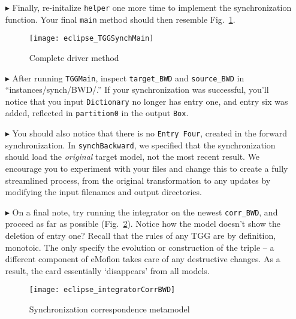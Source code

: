 \begin{itemize}
\item[$\blacktriangleright$] Finally, re-initalize \texttt{helper} one more time to implement the synchronization function. Your final \texttt{main} method
should then resemble Fig.~\ref{eclipse:TGGSynchMain}.

\begin{figure}[htbp]
\begin{center}
  \texttt{[image: eclipse\_TGGSynchMain]}
  \caption{Complete driver method}
  \label{eclipse:TGGSynchMain}
\end{center}
\end{figure}

\item[$\blacktriangleright$] After running \texttt{TGGMain}, inspect \texttt{target\_BWD} and \texttt{source\_BWD} in ``instances/synch/BWD/.'' If your
synchronization was successful, you'll notice that you input \texttt{Dictionary} no longer has entry one, and entry six was added, reflected in
\texttt{partition0} in the output \texttt{Box}. 

\item[$\blacktriangleright$] You should also notice that there is no \texttt{Entry Four}, created in the forward synchronization. In \texttt{synchBackward}, we
specified that the synchronization should load the \emph{original} target model, not the most recent result. We encourage you to experiment with your files and
change this to create a fully streamlined process, from the original transformation to any updates by modifying the input filenames and output
directories.

\newpage

\item[$\blacktriangleright$] On a final note, try running the integrator on the newest \texttt{corr\_BWD}, and proceed as far as possible
(Fig.~\ref{eclipse:synchBwdIntegrator}). Notice how the model doesn't show the deletion of entry one? Recall that the rules of any TGG are by definition,
monotoic. The only specify the evolution or construction of the triple -- a different component of eMoflon takes care of any destructive changes. As a result,
the card essentially `disappears' from all models.

\begin{figure}[htbp]
\begin{center}
  \texttt{[image: eclipse\_integratorCorrBWD]}
  \caption{Synchronization correspondence metamodel}
  \label{eclipse:synchBwdIntegrator}
\end{center}
\end{figure}

\end{itemize}
